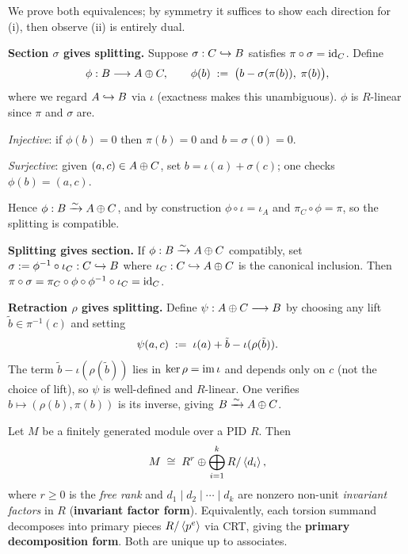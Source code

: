 \documentclass[10pt]{article}
\begin{document}
\begin{solution}
\begin{parts}
    \item We prove both equivalences; by symmetry it suffices to show each direction for (i),
    then observe (ii) is entirely dual.

    \medskip
    \textbf{Section $\sigma$ gives splitting.}
    Suppose $\sigma : C \hookrightarrow B$ satisfies $\pi \circ \sigma = \mathrm{id}_C$. Define
    \[
        \phi : B \longrightarrow A \oplus C, \qquad
        \phi(b) \;:=\; \bigl(b - \sigma(\pi(b)),\; \pi(b)\bigr),
    \]
    where we regard $A \hookrightarrow B$ via $\iota$ (exactness makes this unambiguous). $\phi$ is
    $R$-linear since $\pi$ and $\sigma$ are. 
    \medskip
    
    \textit{Injective}: if $\phi(b) = 0$ then $\pi(b) = 0$ and $b = \sigma(0) = 0$.
    
    \textit{Surjective}: given $(a, c) \in A \oplus C$, set $b = \iota(a) + \sigma(c)$;
    one checks $\phi(b) = (a, c)$.
    \medskip
    
    Hence $\phi : B \xrightarrow{\sim} A \oplus C$, and by construction $\phi \circ \iota = \iota_A$
    and $\pi_C \circ \phi = \pi$, so the splitting is compatible. \qedbox
    \medskip
    
    \textbf{Splitting gives section.}
    If $\phi : B \xrightarrow{\sim} A \oplus C$ compatibly, set
    $\sigma := \phi^{-1} \circ \iota_C : C \hookrightarrow B$
    where $\iota_C : C \hookrightarrow A \oplus C$ is the canonical inclusion. Then
    $\pi \circ \sigma = \pi_C \circ \phi \circ \phi^{-1} \circ \iota_C = \mathrm{id}_C$. \qedbox
    \medskip
    
    \textbf{Retraction $\rho$ gives splitting.}
Define $\psi : A \oplus C \longrightarrow B$ by choosing any lift $\tilde{b} \in \pi^{-1}(c)$ and setting
\[
    \psi(a, c) \;:=\; \iota(a) + \tilde{b} - \iota(\rho(\tilde{b})).
\]
The term $\tilde{b} - \iota(\rho(\tilde{b}))$ lies in $\ker\rho = \operatorname{im}\iota$ and depends only on $c$ (not the choice of lift), so $\psi$ is well-defined and $R$-linear. One verifies $b \mapsto (\rho(b), \pi(b))$ is its inverse, giving $B \xrightarrow{\sim} A \oplus C$.
\qedbox
    \bigskip 
    
    \item Let $M$ be a finitely generated module over a PID $R$. Then
    \[
        M \;\cong\; R^r \oplus \bigoplus_{i=1}^{k} R / \left\langle d_i \right\rangle,
    \]
    where $r \ge 0$ is the \emph{free rank} and $d_1 \mid d_2 \mid \cdots \mid d_k$ are
    nonzero non-unit \emph{invariant factors} in $R$ (\textbf{invariant factor form}).
    Equivalently, each torsion summand decomposes into primary pieces
    $R / \left\langle p^e \right\rangle$ via CRT, giving the \textbf{primary decomposition form}.
    Both are unique up to associates.
\end{parts}
\end{solution}
\end{document}
